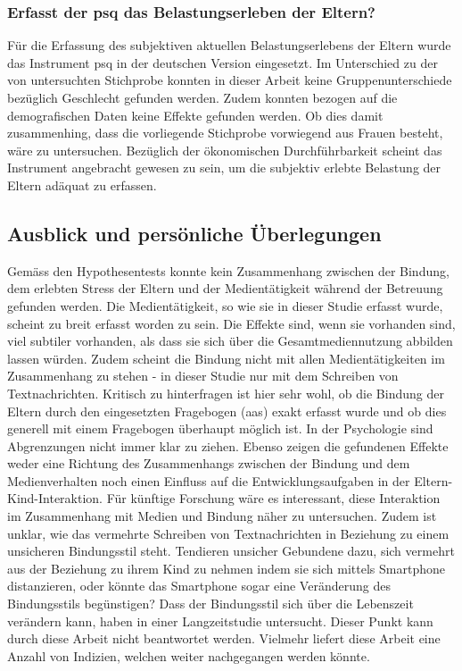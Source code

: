\subsubsection{Erfasst der \acrshort{psq} das Belastungserleben der Eltern?}
Für die Erfassung des subjektiven aktuellen Belastungserlebens der Eltern wurde das Instrument \acrfull{psq} in der deutschen Version eingesetzt. Im Unterschied zu der von  untersuchten Stichprobe konnten in dieser Arbeit keine Gruppenunterschiede bezüglich Geschlecht gefunden werden. Zudem konnten bezogen auf die demografischen Daten keine Effekte gefunden werden. Ob dies damit zusammenhing, dass die vorliegende Stichprobe vorwiegend aus Frauen besteht, wäre zu untersuchen. Bezüglich der ökonomischen Durchführbarkeit scheint das Instrument angebracht gewesen zu sein, um die subjektiv erlebte Belastung der Eltern adäquat zu erfassen.

\subsection{Ausblick und persönliche Überlegungen} \label{sec:Ausblick}
Gemäss den Hypothesentests konnte kein Zusammenhang zwischen der Bindung, dem erlebten Stress der Eltern und der Medientätigkeit während der Betreuung gefunden werden. Die Medientätigkeit, so wie sie in dieser Studie erfasst wurde, scheint zu breit erfasst worden zu sein. Die Effekte sind, wenn sie vorhanden sind, viel subtiler vorhanden, als dass sie sich über die Gesamtmediennutzung abbilden lassen würden. Zudem scheint die Bindung nicht mit allen Medientätigkeiten im Zusammenhang zu stehen - in dieser Studie nur mit dem Schreiben von Textnachrichten. Kritisch zu hinterfragen ist hier sehr wohl, ob die Bindung der Eltern durch den eingesetzten Fragebogen (\acrshort{aas}) exakt erfasst wurde und ob dies generell mit einem Fragebogen überhaupt möglich ist. In der Psychologie sind Abgrenzungen nicht immer klar zu ziehen. Ebenso zeigen die gefundenen Effekte weder eine Richtung des Zusammenhangs zwischen der Bindung und dem Medienverhalten noch einen Einfluss auf die Entwicklungsaufgaben in der Eltern-Kind-Interaktion. Für künftige Forschung wäre es interessant, diese Interaktion im Zusammenhang mit Medien und Bindung näher zu untersuchen. Zudem ist unklar, wie das vermehrte Schreiben von Textnachrichten in Beziehung zu einem unsicheren Bindungsstil steht. Tendieren unsicher Gebundene dazu, sich vermehrt aus der Beziehung zu ihrem Kind zu nehmen indem sie sich mittels Smartphone distanzieren, oder könnte das Smartphone sogar eine Veränderung des Bindungsstils begünstigen? Dass der Bindungsstil sich über die Lebenszeit verändern kann, haben  in einer Langzeitstudie untersucht. Dieser Punkt kann durch diese Arbeit nicht beantwortet werden. Vielmehr liefert diese Arbeit eine Anzahl von Indizien, welchen weiter nachgegangen werden könnte.

